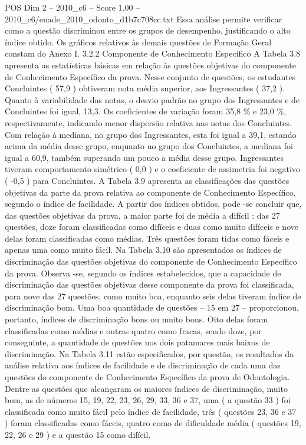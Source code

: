 \begin{textsample}{POS Dim 2 – 2010\_c6 – Score 1.00 – 2010\_c6/enade\_2010\_odonto\_d1b7c708cc.txt}
Essa análise permite verificar como a questão discriminou entre os grupos de desempenho, justificando o alto índice obtido.
Os gráficos relativos às demais questões de Formação Geral constam do Anexo I. 3.2.2 Componente de Conhecimento Específico A Tabela 3.8 apresenta as estatísticas básicas em relação às questões objetivas do componente de Conhecimento Específico da prova.
Nesse conjunto de questões, os estudantes Concluintes ( 57,9 ) obtiveram nota média superior, aos Ingressantes ( 37,2 ).
Quanto à variabilidade das notas, o desvio padrão no grupo dos Ingressantes e de Concluintes foi igual, 13,3.
Os coeficientes de variação foram 35,8 \% e 23,0 \%, respectivamente, indicando menor dispersão relativa nas notas dos Concluintes.
Com relação à mediana, no grupo dos Ingressantes, esta foi igual a 39,1, estando acima da média desse grupo, enquanto no grupo dos Concluintes, a mediana foi igual a 60,9, também superando um pouco a média desse grupo.
Ingressantes tiveram comportamento simétrico ( 0,0 ) e o coeficiente de assimetria foi negativo ( -0,5 ) para Concluintes.
A Tabela 3.9 apresenta as classificações das questões objetivas da parte da prova relativa ao componente de Conhecimento Específico, segundo o índice de facilidade.
A partir dos índices obtidos, pode -se concluir que, das questões objetivas da prova, a maior parte foi de média a difícil : das 27 questões, doze foram classificadas como difíceis e duas como muito difíceis e nove delas foram classificadas como médias.
Três questões foram tidas como fáceis e apenas uma como muito fácil.
Na Tabela 3.10 são apresentados os índices de discriminação das questões objetivas do componente de Conhecimento Específico da prova.
Observa -se, segundo os índices estabelecidos, que a capacidade de discriminação das questões objetivas desse componente da prova foi classificada, para nove das 27 questões, como muito boa, enquanto seis delas tiveram índice de discriminação bom.
Uma boa quantidade de questões – 15 em 27 – proporcionou, portanto, índices de discriminação bons ou muito bons.
Oito delas foram classificadas como médias e outras quatro como fracas, sendo doze, por conseguinte, a quantidade de questões nos dois patamares mais baixos de discriminação.
Na Tabela 3.11 estão especificados, por questão, os resultados da análise relativa aos índices de facilidade e de discriminação de cada uma das questões do componente de Conhecimento Específico da prova de Odontologia.
Dentre as questões que alcançaram os maiores índices de discriminação, muito bom, as de números 15, 19, 22, 23, 26, 29, 33, 36 e 37, uma ( a questão 33 ) foi classificada como muito fácil pelo índice de facilidade, três ( questões 23, 36 e 37 ) foram classificadas como fáceis, quatro como de dificuldade média ( questões 19, 22, 26 e 29 ) e a questão 15 como difícil.

\end{textsample}
